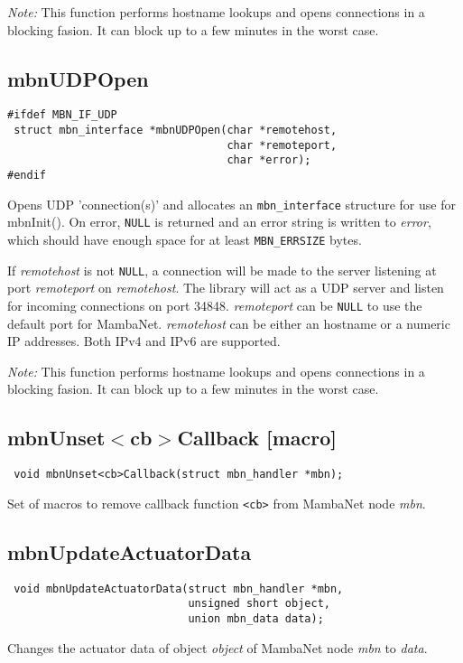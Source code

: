 \emph{Note:} This function performs hostname lookups and opens connections in a blocking fasion. It can block up to a few minutes in the worst case.


\subsection{mbnUDPOpen}
\begin{verbatim}
#ifdef MBN_IF_UDP
 struct mbn_interface *mbnUDPOpen(char *remotehost,
                                  char *remoteport,
                                  char *error);
#endif
\end{verbatim}
Opens UDP 'connection(s)' and allocates an \verb|mbn_interface| structure for use for mbnInit(). On error, \verb|NULL| is returned and an error string is written to \textit{error}, which should have enough space for at least \verb|MBN_ERRSIZE| bytes.

If \textit{remotehost} is not \verb|NULL|, a connection will be made to the server listening at port \textit{remoteport} on \textit{remotehost}.
The library will act as a UDP server and listen for incoming connections on port 34848. \textit{remoteport} can be \verb|NULL| to use the default port for MambaNet. \textit{remotehost} can be either an hostname or a numeric IP addresses. Both IPv4 and IPv6 are supported.

\emph{Note:} This function performs hostname lookups and opens connections in a blocking fasion. It can block up to a few minutes in the worst case.


\subsection{mbnUnset$<$cb$>$Callback \footnotesize{[macro]}}
\begin{verbatim}
 void mbnUnset<cb>Callback(struct mbn_handler *mbn);
\end{verbatim}
Set of macros to remove callback function \verb|<cb>| from MambaNet node \textit{mbn}. 


\subsection{mbnUpdateActuatorData}
\begin{verbatim}
 void mbnUpdateActuatorData(struct mbn_handler *mbn,
                            unsigned short object,
                            union mbn_data data);
\end{verbatim}
Changes the actuator data of object \textit{object} of MambaNet node \textit{mbn} to \textit{data}.


